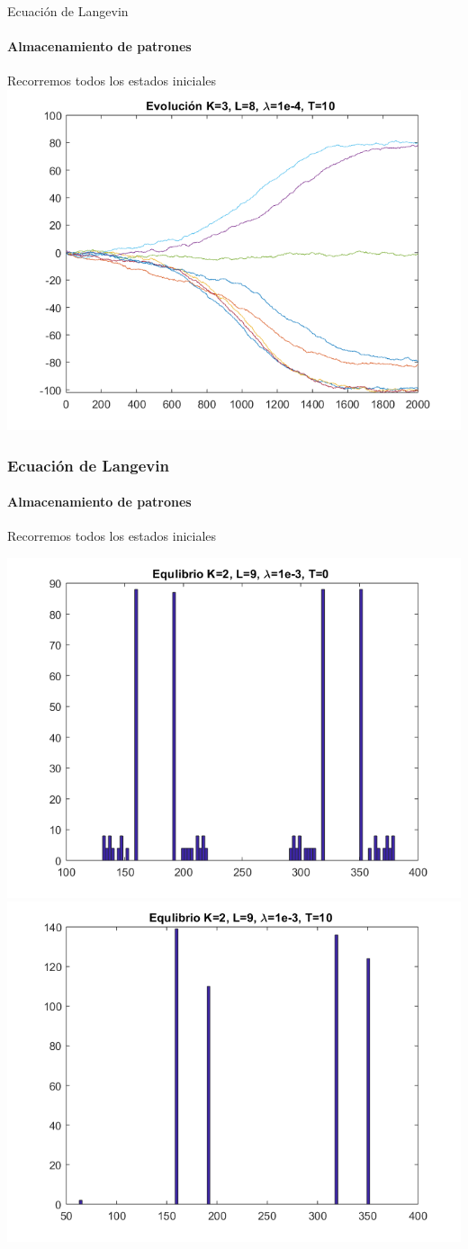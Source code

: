 \documentclass[11pt]{beamer}
\begin{document}
\begin{frame}{Ecuación de Langevin}
\begin{center}
    

    \framesubtitle{Almacenamiento de patrones}
    Recorremos todos los estados iniciales
    \includegraphics[scale=0.4]{EVOk3l8t10.png}
    \end{center}
\end{frame}

\begin{frame}
\frametitle{Ecuación de Langevin}
\framesubtitle{Almacenamiento de patrones}

 Recorremos todos los estados iniciales\hspace{5cm}

	\includegraphics[width=0.45\linewidth]{k2l9lambda3t0}
	\includegraphics[width=0.45\linewidth]{k2l9lambda3t10}

\end{frame}
\end{document}
